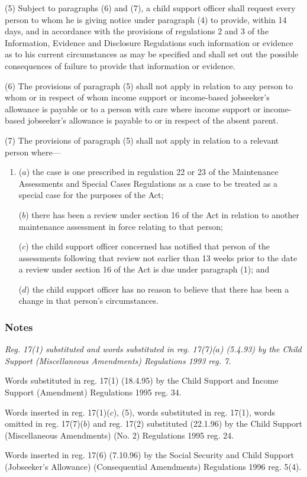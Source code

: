\documentclass[a4paper]{article}
\newcommand\amendment[1]{\subsubsection*{Notes}{\itshape\frenchspacing\footnotesize #1 \par}}
\begin{document}
(5) Subject to paragraphs (6) and (7), a child support officer shall request every person to whom he is giving notice under paragraph (4) to provide, within 14 days, and in accordance with the provisions of regulations 2 and 3 of the Information, Evidence and Disclosure Regulations such information or evidence as to his current circumstances as may be specified
and shall set out the possible consequences of failure to provide that information or evidence.  %

(6) The provisions of paragraph (5) shall not apply in relation to any person to whom or in respect of whom income support 
or income-based jobseeker’s allowance  %
is payable or to a person with care where income support 
or income-based jobseeker’s allowance  %
is payable to or in respect of the absent parent.

(7) The provisions of paragraph (5) shall not apply in relation to a relevant person where—
\begin{enumerate}\item[]
($a$) 
the case is one %
prescribed in regulation 22 or 23 of the Maintenance Assessments and Special Cases Regulations as a case to be treated as a special case for the purposes of the Act;

($b$) there has been a review under section 16 
of the Act in relation to another maintenance assessment in force relating to that person;

($c$) the child support officer concerned has notified that person of the assessments following that review not earlier than 13 weeks prior to the date a review under section 16 of the Act is due under paragraph (1); and

($d$) the child support officer has no reason to believe that there has been a change in that person’s circumstances.
\end{enumerate}

\amendment{
Reg. 17(1)%
{} substituted and words substituted in reg. 17(7)($a$) (5.4.93) by the Child Support (Miscellaneous Amendments) Regulations 1993 reg. 7.

Words substituted in reg. 17(1) %
(18.4.95) by the Child Support and Income Support (Amendment) Regulations 1995 reg. 34.

Words inserted in reg. 17(1)($c$), (5), words substituted in reg. 17(1), words omitted in reg. 17(7)($b$) and reg. 17(2) substituted (22.1.96) by the Child Support (Miscellaneous Amendments) (No. 2) Regulations 1995 reg. 24.

Words inserted in reg. 17(6) (7.10.96) by the Social Security and Child Support (Jobseeker's Allowance) (Consequential Amendments) Regulations 1996 reg. 5(4).
}
\end{document}

